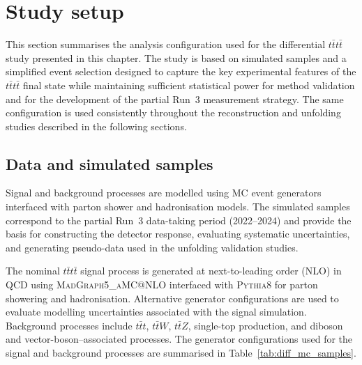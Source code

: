 \section{Study setup}

This section summarises the analysis configuration used for the differential $t\bar{t}t\bar{t}$ study presented in this chapter. 
The study is based on simulated samples and a simplified event selection designed to capture the key experimental features of the $t\bar{t}t\bar{t}$ final state while maintaining sufficient statistical power for method validation and for the development of the partial Run~3 measurement strategy. 
The same configuration is used consistently throughout the reconstruction and unfolding studies described in the following sections.

\subsection{Data and simulated samples}

Signal and background processes are modelled using MC event generators interfaced with parton shower and hadronisation models. 
The simulated samples correspond to the partial Run~3 data-taking period (2022--2024) and provide the basis for constructing the detector response, evaluating systematic uncertainties, and generating pseudo-data used in the unfolding validation studies.

The nominal $t\bar{t}t\bar{t}$ signal process is generated at next-to-leading order (NLO) in QCD using \textsc{MadGraph5\_aMC@NLO} interfaced with \textsc{Pythia8} for parton showering and hadronisation. 
Alternative generator configurations are used to evaluate modelling uncertainties associated with the signal simulation. 
Background processes include $t\bar{t}t$, $t\bar{t}W$, $t\bar{t}Z$, single-top production, and diboson and vector-boson–associated processes. 
The generator configurations used for the signal and background processes are summarised in Table~\ref{tab:diff_mc_samples}.

